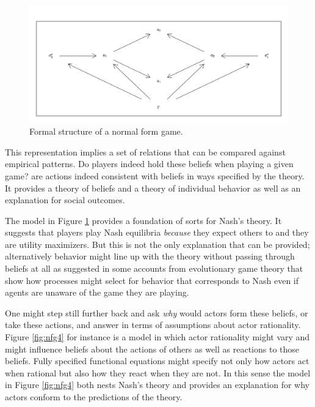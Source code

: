 \documentclass[
  12pt,
]{book}
\begin{document}
\begin{figure}

{\centering \includegraphics[width=0.8\linewidth]{ii_files/figure-latex/nfg3-1} 

}

\caption{Formal structure of a normal form game.}\label{fig:nfg3}
\end{figure}

This representation implies a set of relations that can be compared against empirical patterns. Do players indeed hold these beliefs when playing a given game? are actions indeed consistent with beliefs in ways specified by the theory. It provides a theory of beliefs and a theory of individual behavior as well as an explanation for social outcomes.

The model in Figure \ref{fig:nfg3} provides a foundation of sorts for Nash's theory. It suggests that players play Nash equilibria \emph{because} they expect others to and they are utility maximizers. But this is not the only explanation that can be provided; alternatively behavior might line up with the theory without passing through beliefs at all as suggested in some accounts from evolutionary game theory that show how processes might select for behavior that corresponds to Nash even if agents are unaware of the game they are playing.

One might step still further back and ask \emph{why} would actors form these beliefs, or take these actions, and answer in terms of assumptions about actor rationality. Figure \ref{fig:nfg4} for instance is a model in which actor rationality might vary and might influence beliefs about the actions of others as well as reactions to those beliefs. Fully specified functional equations might specify not only how actors act when rational but also how they react when they are not. In this sense the model in Figure \ref{fig:nfg4} both nests Nash's theory and provides an explanation for why actors conform to the predictions of the theory.
\end{document}
